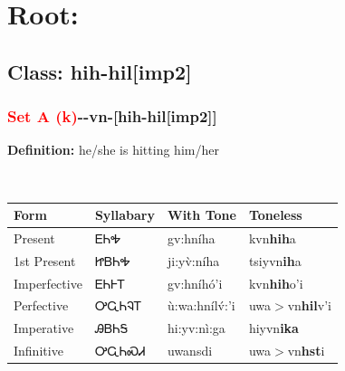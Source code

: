 \needspace{4in}
\section*{Root: }
\markboth{}{}
\nopagebreak
{}
\needspace{3in}
\subsection*{Class: hih-hil[imp2]}
\nopagebreak
\needspace{2in}
\subsubsection*{\textcolor{Red}{Set A (k)}{-}\textbf{}{-}vn{-}[hih-hil[imp2]]}
\nopagebreak
\textbf{Definition: } he/she is hitting him/her
\\[0.5em]
\begin{tabularx}{\textwidth}{l X X X}%
\toprule%
\textbf{Form}&\textbf{Syllabary}&\textbf{With Tone}&\textbf{Toneless}\\%
\midrule%
Present&ᎬᏂᎭ&gv:hníha&kvn\textbf{hih}a\\%
1st Present&ᏥᏴᏂᎭ&ji:yv̀:níha&tsiyvn\textbf{ih}a\\%
Imperfective&ᎬᏂᎰᎢ&gv:hníhó’i&kvn\textbf{hih}o'i\\%
Perfective&ᎤᏩᏂᎸᎢ&ù:wa:hnílv́:’i&uwa\ensuremath{>}vn\textbf{hil}v'i\\%
Imperative&ᎯᏴᏂᎦ&hi:yv:nì:ga&hiyvn\textbf{ika}\\%
Infinitive&ᎤᏩᏂᏍᏗ&uwansdi&uwa\ensuremath{>}vn\textbf{hst}i\\%
\bottomrule%
\end{tabularx}
\\[1em]